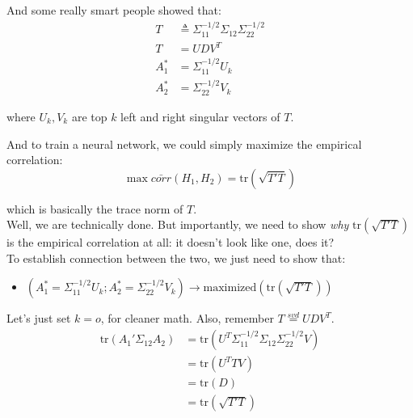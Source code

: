 \documentclass[12pt]{article}
\begin{document}
And some really smart people showed that:
\begin{align*}
    T &\triangleq \Sigma_{11}^{-1/2}\Sigma_{12}\Sigma_{22}^{-1/2}\\
    T &= U D V^T\\
    A_1^* &= \Sigma_{11}^{-1/2}U_k\\
    A_2^* &= \Sigma_{22}^{-1/2}V_k
\end{align*}

where $U_k, V_k$ are top $k$ left and right singular vectors of $T$. 

And to train a neural network, we could simply maximize the empirical correlation:
\[\max \bar{corr}(H_1, H_2) = \text{tr}(\sqrt{T'T})\]

which is basically the trace norm of $T$. \\

Well, we are technically done. But importantly, we need to show \emph{why} $\text{tr}(\sqrt{T'T})$ is the empirical correlation at all: it doesn't look like one, does it?\\

To establish connection between the two, we just need to show that:
\begin{itemize}
    \item $(A_1^* = \Sigma_{11}^{-1/2}U_k; A_2^* = \Sigma_{22}^{-1/2}V_k)\to \text{maximized} (\text{tr}(\sqrt{T'T}))$
\end{itemize}

Let's just set $k = o$, for cleaner math. Also, remember $T \stackrel{svd}{=} UDV^T$.
\begin{align*}
    \text{tr}(A_1'\Sigma_{12}A_2) 
        &= \text{tr}(U^T\Sigma_{11}^{-1/2}\Sigma_{12}\Sigma_{22}^{-1/2}V)\\
        &= \text{tr}(U^T T V)\\
        &= \text{tr}(D)\\
        &= \text{tr}(\sqrt{T'T})
\end{align*}


\end{document}
